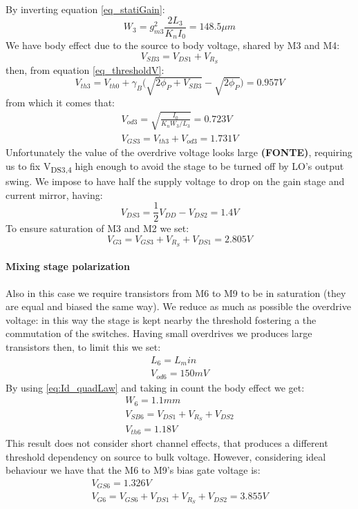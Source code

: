 By inverting equation \ref{eq_statiGain}:
\begin{equation}
W_3 = g_{m3}^2\frac{2L_{3}}{K_nI_0} = 148.5 \mu m
\end{equation}
We have body effect due to the source to body voltage, shared by M3 and M4:
\begin{equation}
	V_{SB3} = V_{DS1}+V_{R_S}
\end{equation} 
then, from equation \ref{eq_thresholdV}:
\begin{equation}
	V_{th3} = V_{th0}+\gamma_B\big(\sqrt{2\phi_P + V_{SB3}}-\sqrt{2\phi_P}\big) = 0.957 V 
\end{equation}
from which it comes that:
\begin{gather}
	V_{od3}=\sqrt{\frac{I_0}{K_n W_3/L_3}} = 0.723 V \\
	V_{GS3} = V_{th3}+V_{od3} = 1.731 V
\end{gather}
Unfortunately the value of the overdrive voltage looks large \textbf{(FONTE)}, requiring us to fix V\textsubscript{DS3,4} high enough to avoid the stage to be turned off by LO's output swing. We impose to have half the supply voltage to drop on the gain stage and current mirror, having:
\begin{equation}
	V_{DS3} = \frac{1}{2}V_{DD}-V_{DS2} = 1.4 V
\end{equation}
To ensure saturation of M3 and M2 we set:
\begin{equation}
	V_{G3}=V_{GS3} +V_{R_{S}}+V_{DS1} = 2.805 V 
\end{equation}

\paragraph{Mixing stage polarization}

Also in this case we require transistors from M6 to M9 to be in saturation (they are equal and biased the same way). We reduce as much as possible the overdrive voltage: in this way the stage is kept nearby the threshold fostering a the commutation of the switches. Having small overdrives we produces large transistors then, to limit this we set:
\begin{gather}
	L_6 = L_min  \\
	V_{od6} = 150mV 
\end{gather}
By using \ref{eq:Id_quadLaw} and taking in count the body effect we get:
\begin{gather}
W_6 = 1.1mm \\
V_{SB6} = V_{DS1}+V_{R_S}+V_{DS2}\\
V_{th6} = 1.18V
\end{gather}
This result does not consider short channel effects, that produces a different threshold dependency on source to bulk voltage. However, considering ideal behaviour we have that the M6 to M9's bias gate voltage is:
\begin{gather}
	V_{GS6}=1.326V \\
	V_{G6} = V_{GS6}+V_{DS1}+V_{R_S}+V_{DS2} = 3.855V
\end{gather}







